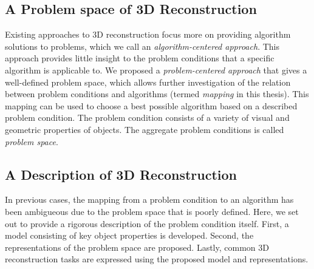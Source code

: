 \subsection{A Problem space of 3D Reconstruction}
Existing approaches to 3D reconstruction focus more on providing algorithm solutions to problems, which we call an \textit{algorithm-centered approach}. This approach provides little insight to the problem conditions that a specific algorithm is applicable to. We proposed a \textit{problem-centered approach} that gives a well-defined problem space, which allows further investigation of the relation between problem conditions and algorithms (termed \textit{mapping} in this thesis). This mapping can be used to choose a best possible algorithm based on a described problem condition. The problem condition consists of a variety of visual and geometric properties of objects. The aggregate problem conditions is called \textit{problem space}.

\subsection{A Description of 3D Reconstruction}
In previous cases, the mapping from a problem condition to an algorithm has been ambigueous due to the problem space that is poorly defined. Here, we set out to provide a rigorous description of the problem condition itself. First, a model consisting of key object properties is developed. Second, the representations of the problem space are proposed. Lastly, common 3D reconstruction tasks are expressed using the proposed model and representations.



